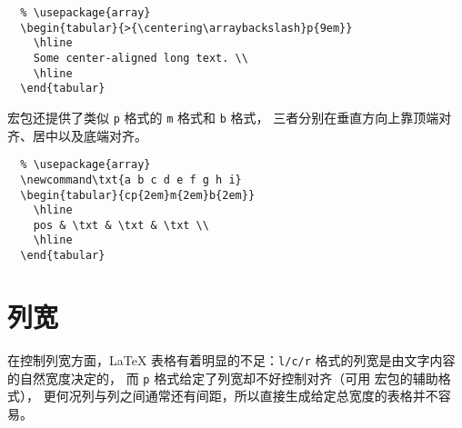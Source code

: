 \begin{lstlisting}
  % \usepackage{array}
  \begin{tabular}{>{\centering\arraybackslash}p{9em}}
    \hline
    Some center-aligned long text. \\
    \hline
  \end{tabular}
\end{lstlisting}

\begin{center}
\end{center}

 宏包还提供了类似 \texttt{p} 格式的 \texttt{m} 格式和 \texttt{b} 格式，
三者分别在垂直方向上靠顶端对齐、居中以及底端对齐。
\begin{lstlisting}
  % \usepackage{array}
  \newcommand\txt{a b c d e f g h i}
  \begin{tabular}{cp{2em}m{2em}b{2em}}
    \hline
    pos & \txt & \txt & \txt \\
    \hline
  \end{tabular}
\end{lstlisting}
\begin{center}
\end{center}
\clearpage
\section{列宽}
在控制列宽方面，\LaTeX{} 表格有着明显的不足：\texttt{l/c/r} 格式的列宽是由文字内容的自然宽度决定的，
而 \texttt{p} 格式给定了列宽却不好控制对齐（可用  宏包的辅助格式），
更何况列与列之间通常还有间距，所以直接生成给定总宽度的表格并不容易。

